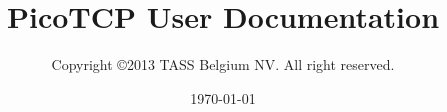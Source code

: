 %






\usepackage{longtable}

 \usepackage{draftwatermark}

\usepackage[compact]{titlesec}

\usepackage{enumitem}

\setcounter{tocdepth}{1}




\title{PicoTCP User Documentation}
\author{Copyright \copyright 2013 TASS Belgium NV. All right reserved.}
\date{\today}
\maketitle

\thispagestyle{empty}



\tableofcontents

%

